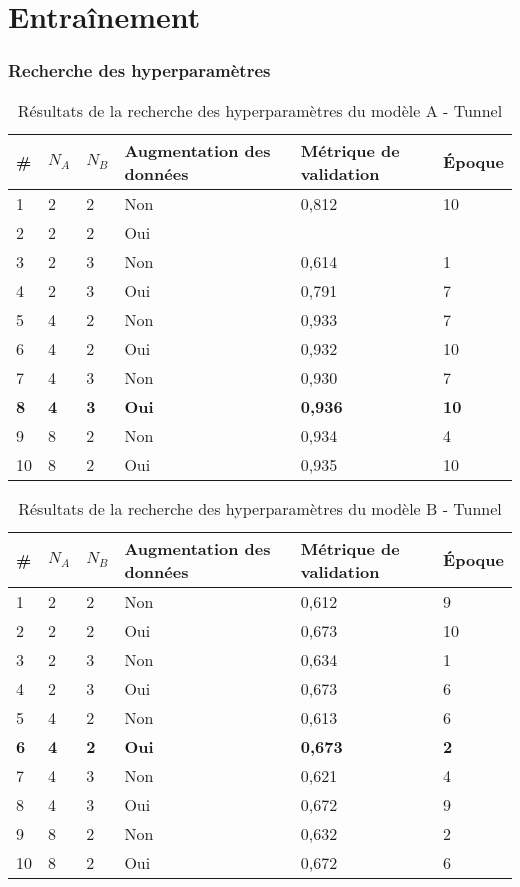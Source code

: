 \section{Entraînement}
\subsubsection{Recherche des hyperparamètres}

\begin{table}[H]
    \centering
    \caption{Résultats de la recherche des hyperparamètres du modèle A - Tunnel}
    \label{tab:resultat_tunnel_modele_a}
    \begin{tabular}{lllp{3cm}p{3cm}l}
        \midrule
        \# & \(N_A\) & \(N_B\) & Augmentation des données & Métrique de validation & Époque\\
        \midrule\midrule
        1  & 2 & 2 & Non & 0,812 & 10\\
        2  & 2 & 2 & Oui & \\
        3  & 2 & 3 & Non & 0,614 & 1\\
        4  & 2 & 3 & Oui & 0,791 & 7\\
        5  & 4 & 2 & Non & 0,933 & 7\\
        6  & 4 & 2 & Oui & 0,932 & 10\\
        7  & 4 & 3 & Non & 0,930 & 7\\
        \textbf{8}  & \textbf{4} & \textbf{3} & \textbf{Oui} & \textbf{0,936} & \textbf{10}\\
        9  & 8 & 2 & Non & 0,934 & 4\\
        10 & 8 & 2 & Oui & 0,935 & 10\\
        \midrule
    \end{tabular}
\end{table}

\begin{table}[H]
    \centering
    \caption{Résultats de la recherche des hyperparamètres du modèle B - Tunnel}
    \label{tab:resultat_tunnel_modele_b}
    \begin{tabular}{lllp{3cm}p{3cm}l}
        \midrule
        \# & \(N_A\) & \(N_B\) & Augmentation des données & Métrique de validation & Époque\\
        \midrule\midrule
        1  & 2 & 2 & Non & 0,612 & 9\\
        2  & 2 & 2 & Oui & 0,673 & 10\\
        3  & 2 & 3 & Non & 0,634 & 1\\
        4  & 2 & 3 & Oui & 0,673 & 6\\
        5  & 4 & 2 & Non & 0,613 & 6\\
        \textbf{6}  & \textbf{4} & \textbf{2} & \textbf{Oui} & \textbf{0,673} & \textbf{2}\\
        7  & 4 & 3 & Non & 0,621 & 4\\
        8  & 4 & 3 & Oui & 0,672 & 9\\
        9  & 8 & 2 & Non & 0,632 & 2\\
        10 & 8 & 2 & Oui & 0,672 & 6\\
        \midrule
    \end{tabular}
\end{table}

